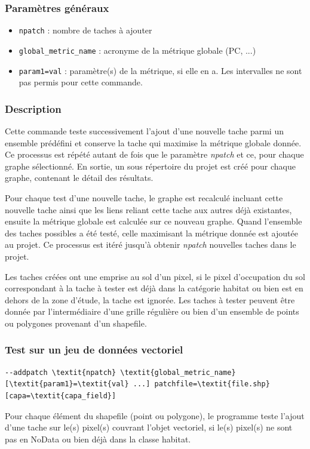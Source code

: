 \documentclass[a4paper,10pt]{report}
\begin{document}
\subsubsection{Paramètres généraux}
\begin{itemize}
	\item \verb|npatch| : nombre de taches à ajouter
	\item \verb|global_metric_name| : acronyme de la métrique globale (PC, ...)
	\item \verb|param1=val| : paramètre(s) de la métrique, si elle en a. Les intervalles ne sont pas permis pour cette commande.
\end{itemize}

\subsubsection{Description}
Cette commande teste successivement l'ajout d'une nouvelle tache parmi un ensemble prédéfini et conserve la tache qui maximise la métrique globale donnée. 
Ce processus est répété autant de fois que le paramètre \textit{npatch} et ce, pour chaque graphe sélectionné. 
En sortie, un sous répertoire du projet est créé pour chaque graphe, contenant le détail des résultats.

Pour chaque test d'une nouvelle tache, le graphe est recalculé incluant cette nouvelle tache ainsi que les liens reliant cette tache aux autres déjà existantes, ensuite la métrique globale est calculée sur ce nouveau graphe. Quand l'ensemble des taches possibles a été testé, celle maximisant la métrique donnée est ajoutée au projet. Ce processus est itéré jusqu'à obtenir \textit{npatch} nouvelles taches dans le projet.

Les taches créées ont une emprise au sol d'un pixel, si le pixel d'occupation du sol correspondant à la tache à tester est déjà dans la catégorie habitat ou bien est en dehors de la zone d'étude, la tache est ignorée. 
Les taches à tester peuvent être donnée par l'intermédiaire d'une grille régulière ou bien d'un ensemble de points ou polygones provenant d'un shapefile.

\subsubsection{Test sur un jeu de données vectoriel}
\begin{Verbatim}[commandchars=\\\{\}]
--addpatch \textit{npatch} \textit{global_metric_name} [\textit{param1}=\textit{val} ...] patchfile=\textit{file.shp} [capa=\textit{capa_field}]
\end{Verbatim}
Pour chaque élément du shapefile (point ou polygone), le programme teste l'ajout d'une tache sur le(s) pixel(s) couvrant l'objet vectoriel, si le(s) pixel(s) ne sont pas en NoData ou bien déjà dans la classe habitat.
\end{document}

